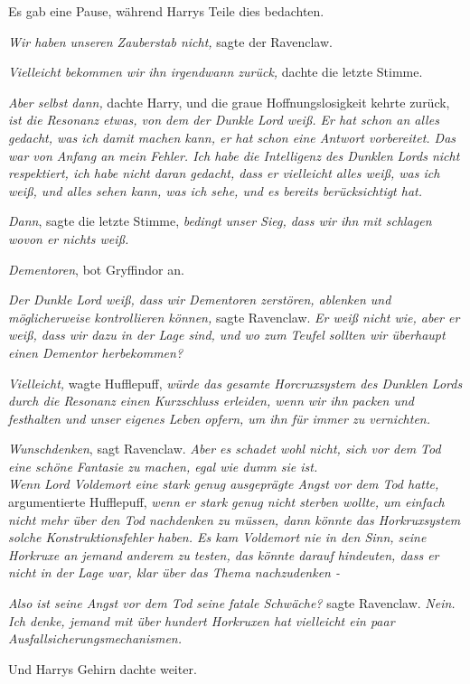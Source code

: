 {Es gab eine Pause, während Harrys Teile dies bedachten.

\emph{Wir haben unseren Zauberstab nicht,} sagte der Ravenclaw.

\emph{Vielleicht bekommen wir ihn irgendwann zurück,} dachte die letzte Stimme.

\emph{Aber selbst dann,} dachte Harry, und die graue Hoffnungslosigkeit kehrte zurück, \emph{ist die Resonanz etwas, von dem der Dunkle Lord weiß. Er hat schon an alles gedacht, was ich damit machen kann, er hat schon eine Antwort vorbereitet. Das war von Anfang an mein Fehler. Ich habe die Intelligenz des Dunklen Lords nicht respektiert, ich habe nicht daran gedacht, dass er vielleicht alles weiß, was ich weiß, und alles sehen kann, was ich sehe, und es bereits berücksichtigt hat.}

\emph{Dann}, sagte die letzte Stimme, \emph{bedingt unser Sieg, dass wir ihn mit schlagen wovon er nichts weiß.}

\emph{Dementoren}, bot Gryffindor an.

\emph{Der Dunkle Lord weiß, dass wir Dementoren zerstören, ablenken und möglicherweise kontrollieren können,} sagte Ravenclaw. \emph{Er weiß nicht wie, aber er weiß, dass wir dazu in der Lage sind, und wo zum Teufel sollten wir überhaupt einen Dementor herbekommen?}

\emph{Vielleicht,} wagte Hufflepuff, \emph{würde das gesamte Horcruxsystem des Dunklen Lords durch die Resonanz einen Kurzschluss erleiden, wenn wir ihn packen und festhalten und unser eigenes Leben opfern, um ihn für immer zu vernichten.}

\emph{Wunschdenken}, sagt Ravenclaw. \emph{Aber es schadet wohl nicht, sich vor dem Tod eine schöne Fantasie zu machen, egal wie dumm sie ist.}\\ \emph{\hfill\break Wenn Lord Voldemort eine stark genug ausgeprägte Angst vor dem Tod hatte,} argumentierte Hufflepuff, \emph{wenn er stark genug nicht sterben wollte, um einfach nicht mehr über den Tod nachdenken zu müssen, dann könnte das Horkruxsystem solche Konstruktionsfehler haben. Es kam Voldemort nie in den Sinn, seine Horkruxe an jemand anderem zu testen, das könnte darauf hindeuten, dass er nicht in der Lage war, klar über das Thema nachzudenken -}

\emph{Also ist seine Angst vor dem Tod seine fatale Schwäche?} sagte Ravenclaw. \emph{Nein. Ich denke, jemand mit über hundert Horkruxen hat vielleicht ein paar Ausfallsicherungsmechanismen.}

Und Harrys Gehirn dachte weiter.

}
